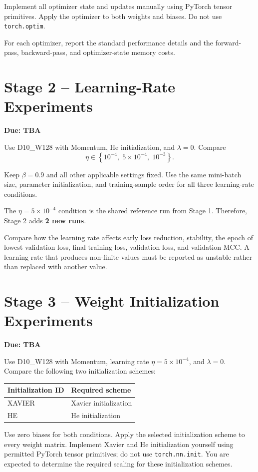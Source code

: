 \documentclass[11pt]{article}
\newcommand{\stagetwodue}{TBA}
\newcommand{\stagethreedue}{TBA}
\begin{document}
Implement all optimizer state and updates manually using PyTorch tensor primitives. Apply the optimizer to both weights and biases. Do not use \texttt{torch.optim}.

For each optimizer, report the standard performance details and the forward-pass, backward-pass, and optimizer-state memory costs.

\section{Stage 2 -- Learning-Rate Experiments}
\textbf{Due: \stagetwodue}

Use D10\_W128 with Momentum, He initialization, and $\lambda=0$. Compare
\[
\eta \in \left\{10^{-4},\;5\times10^{-4},\;10^{-3}\right\}.
\]

Keep $\beta=0.9$ and all other applicable settings fixed. Use the same mini-batch size, parameter initialization, and training-sample order for all three learning-rate conditions.

The $\eta=5\times10^{-4}$ condition is the shared reference run from Stage 1. Therefore, Stage 2 adds \textbf{2 new runs}.

Compare how the learning rate affects early loss reduction, stability, the epoch of lowest validation loss, final training loss, validation loss, and validation MCC. A learning rate that produces non-finite values must be reported as unstable rather than replaced with another value.

\section{Stage 3 -- Weight Initialization Experiments}
\textbf{Due: \stagethreedue}

Use D10\_W128 with Momentum, learning rate $\eta=5\times10^{-4}$, and $\lambda=0$. Compare the following two initialization schemes:

\begin{center}
\begin{tabular}{ll}
\toprule
Initialization ID & Required scheme \\
\midrule
XAVIER & Xavier initialization \\
HE & He initialization \\
\bottomrule
\end{tabular}
\end{center}

Use zero biases for both conditions. Apply the selected initialization scheme to every weight matrix. Implement Xavier and He initialization yourself using permitted PyTorch tensor primitives; do not use \texttt{torch.nn.init}. You are expected to determine the required scaling for these initialization schemes.
\end{document}
